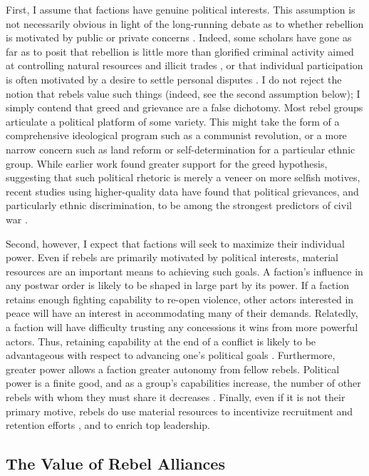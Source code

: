 \documentclass[12pt,]{book}
\begin{document}
First, I assume that factions have genuine political interests. This
assumption is not necessarily obvious in light of the long-running
debate as to whether rebellion is motivated by public or private
concerns \citep[see][]{Collier2004}. Indeed, some scholars have gone as
far as to posit that rebellion is little more than glorified criminal
activity aimed at controlling natural resources and illicit trades
\citep{mueller00}, or that individual participation is often motivated
by a desire to settle personal disputes \citep{Kalyvas2006}. I do not
reject the notion that rebels value such things (indeed, see the second
assumption below); I simply contend that greed and grievance are a false
dichotomy. Most rebel groups articulate a political platform of some
variety. This might take the form of a comprehensive ideological program
such as a communist revolution, or a more narrow concern such as land
reform or self-determination for a particular ethnic group. While
earlier work found greater support for the greed hypothesis, suggesting
that such political rhetoric is merely a veneer on more selfish motives,
recent studies using higher-quality data have found that political
grievances, and particularly ethnic discrimination, to be among the
strongest predictors of civil war \citep{Cederman2010}.

Second, however, I expect that factions will seek to maximize their
individual power. Even if rebels are primarily motivated by political
interests, material resources are an important means to achieving such
goals. A faction's influence in any postwar order is likely to be shaped
in large part by its power. If a faction retains enough fighting
capability to re-open violence, other actors interested in peace will
have an interest in accommodating many of their demands. Relatedly, a
faction will have difficulty trusting any concessions it wins from more
powerful actors. Thus, retaining capability at the end of a conflict is
likely to be advantageous with respect to advancing one's political
goals \citep{Nygard2014}. Furthermore, greater power allows a faction
greater autonomy from fellow rebels. Political power is a finite good,
and as a group's capabilities increase, the number of other rebels with
whom they must share it decreases \citep{Christia2012, Bapat2012}.
Finally, even if it is not their primary motive, rebels do use material
resources to incentivize recruitment and retention efforts
\citep{Weinstein2007}, and to enrich top leadership.

\subsection{The Value of Rebel
Alliances}\label{the-value-of-rebel-alliances}
\end{document}
